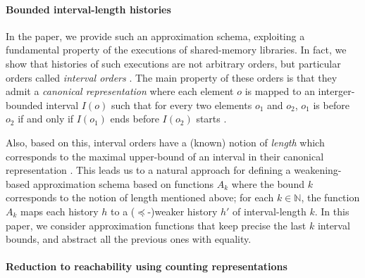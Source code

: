  
\paragraph{Bounded interval-length histories}

In the paper, we provide such an approximation schema, exploiting a fundamental
property of the executions of shared-memory libraries. In fact, we show that
histories of such executions are not arbitrary orders, but particular orders
called \emph{interval orders} \cite{}. The main property of these orders is
that they admit a \emph{canonical representation} where each element $o$ is
mapped to an interger-bounded interval $I(o)$ such that for every two elements
$o_1$ and $o_2$, $o_1$ is before $o_2$ if and only if $I(o_1)$ ends before
$I(o_2)$ starts \cite{}.

Also, based on this, interval orders have a (known) notion of \emph{length}
which corresponds to the maximal upper-bound of an interval in their canonical
representation \cite{}. This leads us to a natural approach for defining a
weakening-based approximation schema based on functions $A_k$ where the bound
$k$ corresponds to the notion of length mentioned above; for each $k \in
\mathbb{N}$, the function $A_k$ maps each history $h$ to a ($\preceq$-)weaker
history $h'$ of interval-length $k$. In this paper, we consider approximation
functions that keep precise the last $k$ interval bounds, and abstract all the
previous ones with equality.

\paragraph{Reduction to reachability using counting representations}


